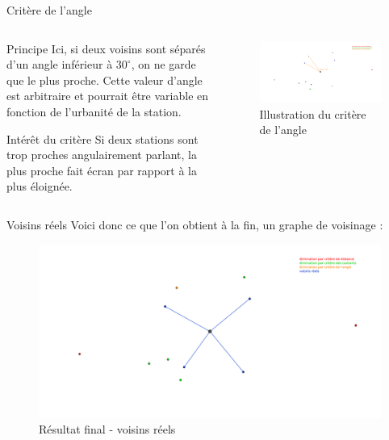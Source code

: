 \begin{frame}{Critère de l'angle}
    \begin{columns}
        \begin{column}{0.4\paperwidth}
            \begin{block}{Principe}
                Ici, si deux voisins sont séparés d'un angle inférieur à $30^{\circ}$, on ne garde que le plus proche. Cette valeur d'angle est arbitraire et pourrait être variable en fonction de l'urbanité de la station.
            \end{block}
            \begin{block}{Intérêt du critère}
                Si deux stations sont trop proches angulairement parlant, la plus proche fait écran par rapport à la plus éloignée.
            \end{block}
        \end{column}
        \begin{column}{0.55\paperwidth}
            \begin{figure}
                \includegraphics[width=0.5\paperwidth]{images/criteria_illustrations/angle.png}
                \caption{\label{fig:angle_crit}Illustration du critère de l'angle}
            \end{figure}
        \end{column}
    \end{columns}
\end{frame}

\begin{frame}{Voisins réels}
    Voici donc ce que l'on obtient à la fin, un graphe de voisinage :
    \begin{figure}
        \includegraphics[width=0.6\paperwidth]{images/criteria_illustrations/final.png}
        \caption{\label{fig:result_crit}Résultat final - voisins réels}
    \end{figure}
\end{frame}

